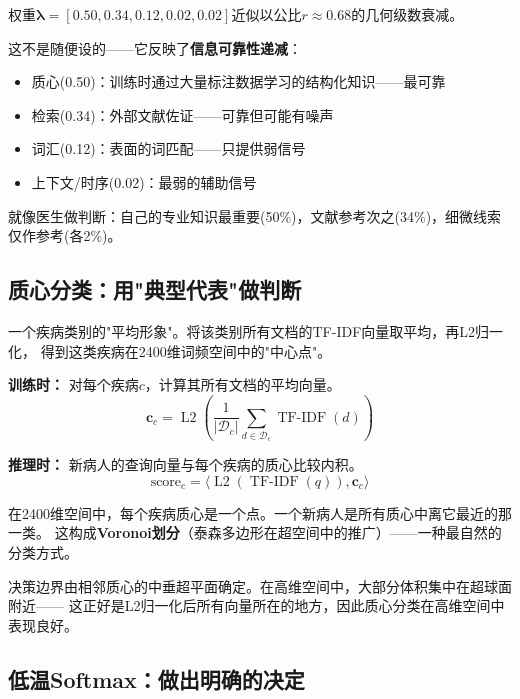 \documentclass[11pt,a4paper]{ctexart}
\DeclareMathOperator{\Ltwo}{L2}
\DeclareMathOperator{\TFIDF}{TF-IDF}
\begin{document}
\begin{keybox}
权重$\boldsymbol{\lambda} = [0.50, 0.34, 0.12, 0.02, 0.02]$近似以公比$r \approx 0.68$的几何级数衰减。

这不是随便设的——它反映了\textbf{信息可靠性递减}：
\begin{itemize}[nosep]
\item 质心(0.50)：训练时通过大量标注数据学习的结构化知识——最可靠
\item 检索(0.34)：外部文献佐证——可靠但可能有噪声
\item 词汇(0.12)：表面的词匹配——只提供弱信号
\item 上下文/时序(0.02)：最弱的辅助信号
\end{itemize}
就像医生做判断：自己的专业知识最重要(50\%)，文献参考次之(34\%)，细微线索仅作参考(各2\%)。
\end{keybox}

\subsection{质心分类：用"典型代表"做判断}

\begin{defbox}[质心 (Centroid)]
一个疾病类别的"平均形象"。将该类别所有文档的TF-IDF向量取平均，再L2归一化，
得到这类疾病在2400维词频空间中的"中心点"。
\end{defbox}

\textbf{训练时：} 对每个疾病$c$，计算其所有文档的平均向量。
$$\mathbf{c}_c = \Ltwo\left(\frac{1}{|\mathcal{D}_c|}\sum_{d \in \mathcal{D}_c} \TFIDF(d)\right)$$

\textbf{推理时：} 新病人的查询向量与每个疾病的质心比较内积。
$$\text{score}_c = \langle \Ltwo(\TFIDF(q)), \mathbf{c}_c \rangle$$

\begin{exambox}
在2400维空间中，每个疾病质心是一个点。一个新病人是所有质心中离它最近的那一类。
这构成\textbf{Voronoi划分}（泰森多边形在超空间中的推广）——一种最自然的分类方式。

决策边界由相邻质心的中垂超平面确定。在高维空间中，大部分体积集中在超球面附近——
这正好是L2归一化后所有向量所在的地方，因此质心分类在高维空间中表现良好。
\end{exambox}

\subsection{低温Softmax：做出明确的决定}
\end{document}
